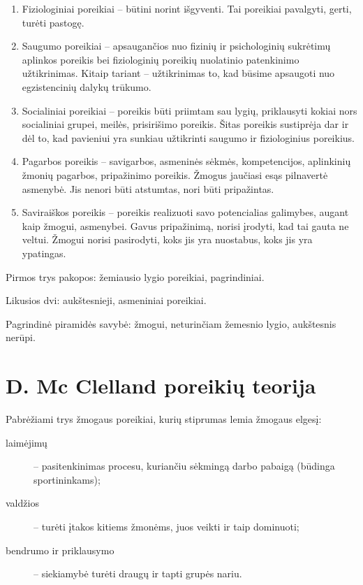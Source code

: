 \begin{enumerate}
  \item Fiziologiniai poreikiai – būtini norint išgyventi. Tai poreikiai
    pavalgyti, gerti, turėti pastogę.
  \item Saugumo poreikiai – apsaugančios nuo fizinių ir psichologinių
    sukrėtimų aplinkos poreikis bei fiziologinių poreikių nuolatinio
    patenkinimo užtikrinimas. Kitaip tariant – užtikrinimas to, kad
    būsime apsaugoti nuo egzistencinių dalykų trūkumo.
  \item Socialiniai poreikiai – poreikis būti priimtam sau lygių,
    priklausyti kokiai nors socialiniai grupei, meilės, prisirišimo
    poreikis. Šitas poreikis sustiprėja dar ir dėl to, kad pavieniui
    yra sunkiau užtikrinti saugumo ir fiziologinius poreikius.
  \item Pagarbos poreikis – savigarbos, asmeninės sėkmės, kompetencijos,
    aplinkinių žmonių pagarbos, pripažinimo poreikis. Žmogus jaučiasi
    esąs pilnavertė asmenybė. Jis nenori būti atstumtas, nori būti
    pripažintas.
  \item Saviraiškos poreikis – poreikis realizuoti savo potencialias
    galimybes, augant kaip žmogui, asmenybei. Gavus pripažinimą, norisi
    įrodyti, kad tai gauta ne veltui. Žmogui norisi pasirodyti, koks
    jis yra nuostabus, koks jis yra ypatingas.
\end{enumerate}

Pirmos trys pakopos: žemiausio lygio poreikiai, pagrindiniai.

Likusios dvi: aukštesnieji, asmeniniai poreikiai.

Pagrindinė piramidės savybė: žmogui, neturinčiam žemesnio lygio, aukštesnis
nerūpi.

\section{D. Mc Clelland poreikių teorija}

Pabrėžiami trys žmogaus poreikiai, kurių stiprumas lemia žmogaus elgesį:
\begin{description}
  \item[laimėjimų] – pasitenkinimas procesu, kuriančiu sėkmingą darbo
    pabaigą (būdinga sportininkams);
  \item[valdžios] – turėti įtakos kitiems žmonėms, juos veikti ir
    taip dominuoti;
  \item[bendrumo ir priklausymo] – siekiamybė turėti draugų ir tapti
    grupės nariu.
\end{description}

